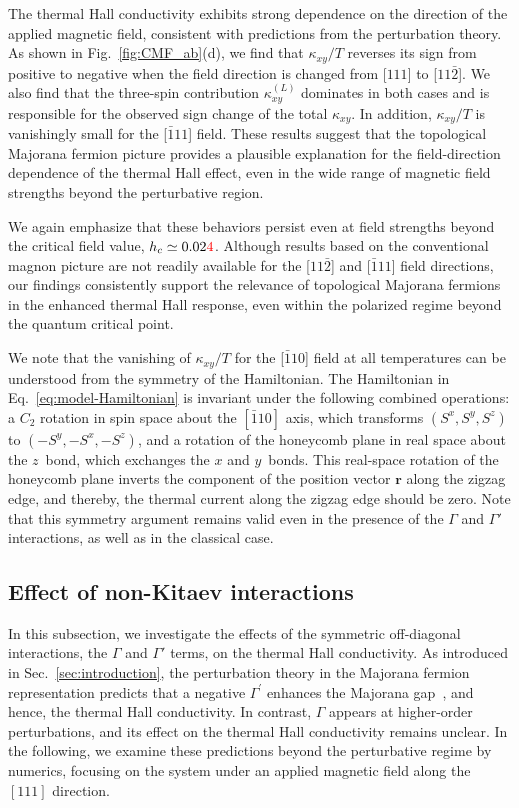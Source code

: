 \documentclass[twocolumn,superscriptaddress,showpacs, longbibliography, aps, prx]{revtex4-2}
\newcommand{\red}[1]{\textcolor{red}{#1}}
\begin{document}
The thermal Hall conductivity exhibits strong dependence on the direction of the applied magnetic field, consistent with predictions from the perturbation theory.
As shown in Fig.~\ref{fig:CMF_ab}(d), we find that $\kappa_{xy}/T$ reverses its sign from positive to negative when the field direction is changed from [$111$] to  [$11\bar{2}$]. 
We also find that the three-spin contribution $\kappa_{xy}^{(L)}$ dominates in both cases and is responsible for the observed sign change of the total $\kappa_{xy}$.
In addition, $\kappa_{xy}/T$ is vanishingly small for the [$\bar{1}11$] field. 
These results suggest that the topological Majorana fermion picture provides a plausible explanation for the field-direction dependence of the thermal Hall effect, even in the wide range of magnetic field strengths beyond the perturbative region. 

We again emphasize that these behaviors persist even at field strengths beyond the critical field value, $h_c \simeq 0.02\red{4}$. 
Although results based on the conventional magnon picture are not readily available for the [$11\bar{2}$] and [$\bar{1}11$] field directions, our findings consistently support the relevance of topological Majorana fermions in the enhanced thermal Hall response, even within the polarized regime beyond the quantum critical point. 

We note that the vanishing of $\kappa_{xy}/T$ for the [$\bar{1}10$] field at all temperatures can be understood from the symmetry of the Hamiltonian.
The Hamiltonian in Eq.~\eqref{eq:model-Hamiltonian} is invariant under the following combined operations: 
a $C_2$ rotation in spin space about the $[\bar{1}10]$ axis, which transforms $(S^x,S^y,S^z)$ to $(-S^y,-S^x,-S^z)$, and a rotation of the honeycomb plane in real space about the $z$~bond, which exchanges the $x$ and $y$~bonds.
This real-space rotation of the honeycomb plane inverts the component of the position vector $\bm{r}$ along the zigzag edge, and thereby, the thermal current along the zigzag edge should be zero.
Note that this symmetry argument remains valid even in the presence of the $\Gamma$ and $\Gamma'$ interactions, as well as in the classical case.


\subsection{Effect of non-Kitaev interactions}
\label{sec:Gamma}
In this subsection, we investigate the effects of the symmetric off-diagonal interactions, the $\Gamma$ and $\Gamma'$ terms, on the thermal Hall conductivity.
As introduced in Sec.~\ref{sec:introduction}, the perturbation theory in the Majorana fermion representation predicts that a negative $\Gamma^{\prime}$ enhances the Majorana gap~\cite{TakikawaF2020}, and hence, the thermal Hall conductivity. 
In contrast, $\Gamma$ appears at higher-order perturbations, and its effect on the thermal Hall conductivity remains unclear.
In the following, we examine these predictions beyond the perturbative regime by numerics, focusing on the system under an applied magnetic field along the $[111]$ direction.
\end{document}
